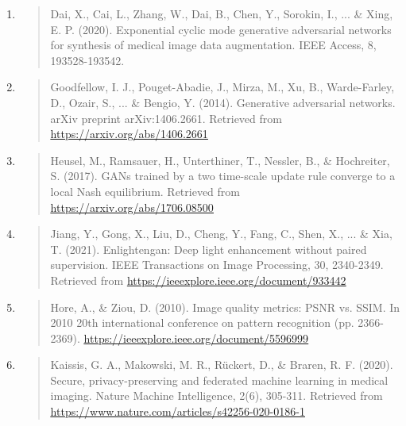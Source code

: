 \documentclass[
]{article}
\begin{document}
\begin{enumerate}
\item
  \begin{quote}
  Dai, X., Cai, L., Zhang, W., Dai, B., Chen, Y., Sorokin, I., ... \&
  Xing, E. P. (2020). Exponential cyclic mode generative adversarial
  networks for synthesis of medical image data augmentation. IEEE
  Access, 8, 193528-193542.
  \end{quote}
\item
  \begin{quote}
  Goodfellow, I. J., Pouget-Abadie, J., Mirza, M., Xu, B., Warde-Farley,
  D., Ozair, S., ... \& Bengio, Y. (2014). Generative adversarial
  networks. arXiv preprint arXiv:1406.2661. Retrieved from
  \href{https://arxiv.org/abs/1406.2661}{\uline{https://arxiv.org/abs/1406.2661}}
  \end{quote}
\item
  \begin{quote}
  Heusel, M., Ramsauer, H., Unterthiner, T., Nessler, B., \& Hochreiter,
  S. (2017). GANs trained by a two time-scale update rule converge to a
  local Nash equilibrium. Retrieved from
  \href{https://arxiv.org/abs/1706.08500}{\uline{https://arxiv.org/abs/1706.08500}}
  \end{quote}
\item
  \begin{quote}
  Jiang, Y., Gong, X., Liu, D., Cheng, Y., Fang, C., Shen, X., ... \&
  Xia, T. (2021). Enlightengan: Deep light enhancement without paired
  supervision. IEEE Transactions on Image Processing, 30, 2340-2349.
  Retrieved from
  \href{https://ieeexplore.ieee.org/document/933442}{\uline{https://ieeexplore.ieee.org/document/933442}}
  \end{quote}
\item
  \begin{quote}
  Hore, A., \& Ziou, D. (2010). Image quality metrics: PSNR vs. SSIM. In
  2010 20th international conference on pattern recognition (pp.
  2366-2369).
  \href{https://ieeexplore.ieee.org/document/5596999}{\uline{https://ieeexplore.ieee.org/document/5596999}}
  \end{quote}
\item
  \begin{quote}
  Kaissis, G. A., Makowski, M. R., Rückert, D., \& Braren, R. F. (2020).
  Secure, privacy-preserving and federated machine learning in medical
  imaging. Nature Machine Intelligence, 2(6), 305-311. Retrieved from
  \href{https://www.nature.com/articles/s42256-020-0186-1}{\uline{https://www.nature.com/articles/s42256-020-0186-1}}
  \end{quote}


\end{enumerate}
\end{document}
